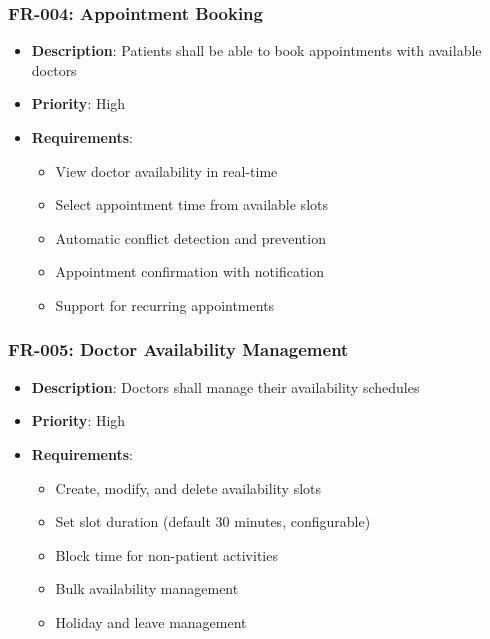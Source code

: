 \documentclass[12pt,a4paper]{article}
\begin{document}
\subsubsection{FR-004: Appointment Booking}
\begin{itemize}
    \item \textbf{Description}: Patients shall be able to book appointments with available doctors
    \item \textbf{Priority}: High
    \item \textbf{Requirements}:
    \begin{itemize}
        \item View doctor availability in real-time
        \item Select appointment time from available slots
        \item Automatic conflict detection and prevention
        \item Appointment confirmation with notification
        \item Support for recurring appointments
    \end{itemize}
\end{itemize}

\subsubsection{FR-005: Doctor Availability Management}
\begin{itemize}
    \item \textbf{Description}: Doctors shall manage their availability schedules
    \item \textbf{Priority}: High
    \item \textbf{Requirements}:
    \begin{itemize}
        \item Create, modify, and delete availability slots
        \item Set slot duration (default 30 minutes, configurable)
        \item Block time for non-patient activities
        \item Bulk availability management
        \item Holiday and leave management
    \end{itemize}
\end{itemize}
\end{document}
